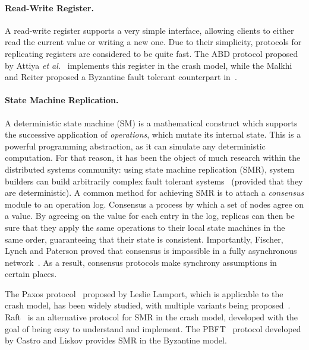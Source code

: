 \paragraph{Read-Write Register.} A read-write register supports a
very simple interface, allowing clients to either read the
current value or writing a new one. Due to their simplicity,
protocols for replicating registers are considered to be quite
fast. The ABD protocol proposed by Attiya
\emph{et al.}~\cite{abd} implements this register in the crash
model, while the Malkhi and Reiter proposed a Byzantine fault tolerant
counterpart in~\cite{bqs}.

\paragraph{State Machine Replication.} A deterministic state machine (SM) is a
mathematical construct which supports the successive application of
\emph{operations}, which mutate its internal state. This is a
powerful programming abstraction, as it can simulate any
deterministic computation. For that reason, it has been the
object of much research within the distributed systems community:
using state machine replication (SMR), system builders can build
arbitrarily complex fault tolerant systems~\cite{schneider-smr} (provided that they
are deterministic). A common method for achieving SMR is to
attach a \emph{consensus} module to an operation log. Consensus
a process by which a set of nodes agree on a value. By agreeing
on the value for each entry in the log, replicas can then be sure
that they apply the same operations to their local state machines in the same order,
guaranteeing that their state is consistent. Importantly,
Fischer, Lynch and Paterson proved that consensus is impossible
in a fully asynchronous network~\cite{flp}. As a result,
consensus protocols make synchrony assumptions in certain places.

The Paxos protocol~\cite{paxos} proposed by Leslie Lamport, which
is applicable to the crash model, has been widely studied, with
multiple variants being
proposed~\cite{fp,fast-paxos,egalitarian-paxos,disk-paxos,paxos_builders}.
Raft~\cite{raft} is an alternative protocol for SMR in the crash
model, developed with the goal of being easy to understand and
implement. The PBFT~\cite{pbft} protocol developed by Castro and
Liskov provides SMR in the Byzantine model.

